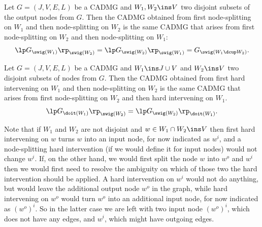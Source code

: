 \begin{Lem}
   Let $G=(J,V,E,L)$ be a CADMG and $W_1, W_2 \ins V$ two disjoint subsets of the output nodes from $G$. 
   Then the CADMG obtained from first node-splitting on $W_1$ and then node-splitting on $W_2$ is the same CADMG that arises from first node-splitting on $W_2$ and then node-splitting on $W_1$:
   \[ \lp G_{\swig(W_1)} \rp_{\swig(W_2)} =  \lp G_{\swig(W_2)} \rp_{\swig(W_1)}  =  G_{\swig(W_1 \dcup W_2)}.   \]
\end{Lem}


\begin{Lem}
   Let $G=(J,V,E,L)$ be a CADMG and $W_1 \ins J \cup V$ and $W_2 \ins V$ two disjoint subsets of nodes from $G$. 
   Then the CADMG obtained from first hard intervening on $W_1$ and then node-splitting on $W_2$ is the same CADMG that arises from first node-splitting on $W_2$ and then hard intervening on $W_1$.
      \[ \lp G_{\doit(W_1)} \rp_{\swig(W_2)} =  \lp G_{\swig(W_2)} \rp_{\doit(W_1)}.   \]
\end{Lem}

\begin{Rem}
    Note that if $W_1$ and $W_2$ are not disjoint and $w \in W_1 \cap W_2 \ins V$ 
    then first hard intervening on $w$ turns $w$ into an input node, for now indicated as $w^i$, and a node-splitting hard intervention (if we would define it for input nodes) would not change $w^i$.
    If, on the other hand, we would first split the node $w$ into $w^o$ and $w^i$ then we would first need to resolve the ambiguity on which of those two the hard intervention should be applied. A hard intervention on $w^i$ would not do anything, but would leave the additional output node $w^o$ in the graph, while hard intervening on $w^o$ would turn $w^o$ into an additional input node, for now indicated as $(w^o)^i$. So in the latter case we are left with two input node $(w^o)^i$, which does not have any edges, and $w^i$, which might have outgoing edges.
\end{Rem}

